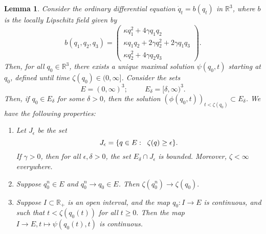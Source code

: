 \documentclass[11pt, notitlepage]{article}
\newtheorem{lem}[thm]{Lemma}
\begin{document}
\begin{lem}\label{lemma: ODE considerations} Consider the ordinary differential equation $\dot{q}_t=b(q_t)$ in $\mathbb{R}^3$, where $b$ is the locally Lipschitz field given by \begin{equation} \label{eq: system of ODEs} b(q_1,q_2,q_3)=\begin{pmatrix}\kappa q_1^2+4\gamma q_1q_2 \\ \kappa q_1q_2+2\gamma q_2^2+2\gamma q_1q_3 \\ \kappa q_2^2 + 4\gamma q_2q_3 \end{pmatrix}. \end{equation} Then, for all $q_0\in \mathbb{R}^3$, there exists a unique maximal solution $\psi(q_0, t)$ starting at $q_0$, defined until time $\zeta(q_0)\in (0, \infty]$. Consider the sets \begin{equation} E=(0, \infty)^3; \hspace{1cm} E_\delta=[\delta,\infty)^3.\end{equation} Then, if $q_0 \in E_\delta$ for some $\delta>0$, then the solution $(\phi(q_0,t))_{t<\zeta(q_0)} \subset E_\delta$. We have the following properties: \begin{enumerate}[label=\roman{*}).] \item Let $J_\epsilon$ be the set \begin{equation} J_\epsilon  =\{q \in E: \hspace{0.2cm} \zeta(q)\ge\epsilon\}.\end{equation} If $\gamma>0$, then for all $\epsilon, \delta>0$, the set $E_\delta \cap J_\epsilon $ is bounded. Moreover, $\zeta<\infty$ everywhere. \item Suppose $q^n_0 \in E$ and $q^n_0 \rightarrow q_0 \in E$. Then $\zeta(q^n_0)\rightarrow \zeta(q_0).$ \item Suppose $I\subset \mathbb{R}_+$ is an open interval, and the map $q_0: I\rightarrow E$ is continuous, and such that $t<\zeta(q_0(t))$ for all $t\ge 0.$ Then the map $I\rightarrow E, t\mapsto \psi(q_0(t), t)$ is continuous. 
 \end{enumerate} \end{lem} 
\end{document}
